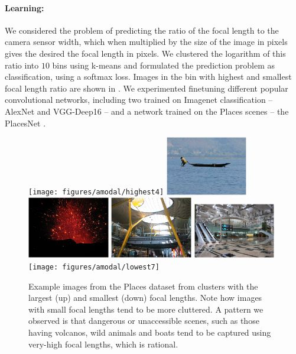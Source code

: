 \paragraph{Learning:} We considered the problem of predicting the ratio of the focal length to the camera sensor width, which when multiplied by the size of the image in pixels gives the desired the focal length in pixels. We clustered the logarithm of this ratio into $10$ bins using k-means and formulated the prediction problem as classification, using a softmax loss. Images in the bin with highest and smallest focal length ratio are shown in . We experimented finetuning different popular convolutional networks, including two trained on Imagenet classification -- AlexNet \cite{krizhevsky2012imagenet} and VGG-Deep16 \cite{simonyan2014very} -- and a network trained on the Places scenes -- the PlacesNet \cite{zhou2014learning}.

\begin{figure}[htb!]
  \centering
  \texttt{[image: figures/amodal/highest4]}
  \includegraphics[width=0.32\textwidth]{figures/amodal/highest3}  
  \includegraphics[width=0.32\textwidth]{figures/amodal/highest6}  
  \includegraphics[width=0.32\textwidth]{figures/amodal/lowest1}
  \includegraphics[width=0.32\textwidth]{figures/amodal/lowest3}  
  \texttt{[image: figures/amodal/lowest7]}
  \caption{ Example images from the Places dataset from clusters with the largest (up) and smallest (down) focal lengths. Note how images with small focal lengths tend to be more cluttered. A pattern we observed is that dangerous or unaccessible scenes, such as those having volcanos, wild animals and boats tend to be captured using very-high focal lengths,  which is rational.}
\end{figure}

